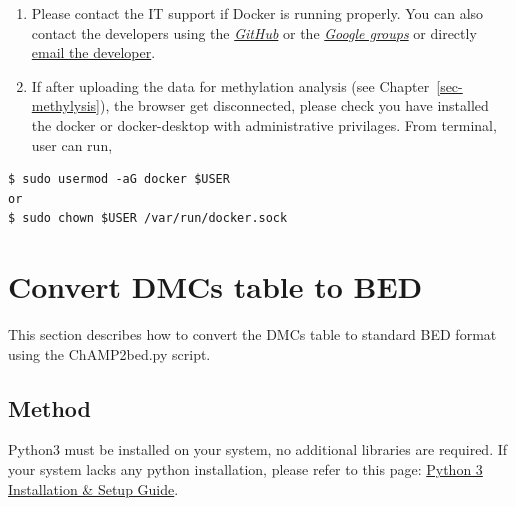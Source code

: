 \documentclass[
  a4paper,
  DIV=11,
  numbers=noendperiod,
  oneside,
  open=any]{scrreport}
\providecommand{\tightlist}{%
  \setlength{\itemsep}{0pt}\setlength{\parskip}{0pt}}\usepackage{longtable,booktabs,array}
\begin{document}
\begin{tcolorbox}[enhanced jigsaw, opacityback=0, toprule=.15mm, bottomtitle=1mm, colback=white, rightrule=.15mm, breakable, coltitle=black, colbacktitle=quarto-callout-note-color!10!white, toptitle=1mm, arc=.35mm, colframe=quarto-callout-note-color-frame, bottomrule=.15mm, opacitybacktitle=0.6, titlerule=0mm, leftrule=.75mm, title=\textcolor{quarto-callout-note-color}{\faInfo}\hspace{0.5em}{Note}, left=2mm]

\begin{enumerate}
\def\labelenumi{\arabic{enumi}.}
\tightlist
\item
  Please contact the IT support if Docker is running properly. You can
  also contact the developers using the
  \href{https://github.com/JD2112/methylr/issues}{\emph{GitHub}} or the
  \href{https://groups.google.com/g/methylr}{\emph{Google groups}} or
  directly \href{mailto:methylr@googlegroups.com}{email the developer}.
\item
  If after uploading the data for methylation analysis (see
  Chapter~\ref{sec-methylysis}), the browser get disconnected, please
  check you have installed the docker or docker-desktop with
  administrative privilages. From terminal, user can run,
\end{enumerate}

\begin{verbatim}
$ sudo usermod -aG docker $USER
or
$ sudo chown $USER /var/run/docker.sock
\end{verbatim}

\end{tcolorbox}

\chapter{Convert DMCs table to BED}\label{sec-bed}

This section describes how to convert the DMCs table to standard BED
format using the ChAMP2bed.py script.

\section{Method}\label{method}

Python3 must be installed on your system, no additional libraries are
required. If your system lacks any python installation, please refer to
this page: \href{https://realpython.com/installing-python/}{Python 3
Installation \& Setup Guide}.
\end{document}
